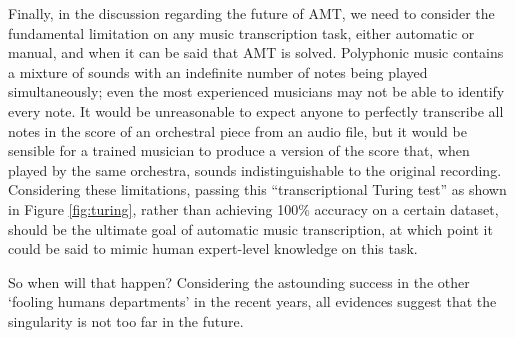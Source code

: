Finally, in the discussion regarding the future of AMT, we need to consider the fundamental limitation on any music transcription task, either automatic or manual, and when it can be said that AMT is solved.
Polyphonic music contains a mixture of sounds with an indefinite number of notes being played simultaneously; even the most experienced musicians may not be able to identify every note. %
It would be unreasonable to expect anyone to perfectly transcribe all notes in the score of an orchestral piece from an audio file, but it would be sensible for a trained musician to produce a version of the score that, when played by the same orchestra, sounds indistinguishable to the original recording.
Considering these limitations, passing this ``transcriptional Turing test'' as shown in Figure \ref{fig:turing}, rather than achieving 100\% accuracy on a certain dataset, should be the ultimate goal of automatic music transcription, at which point it could be said to mimic human expert-level knowledge on this task.

So when will that happen? Considering the astounding success in the other `fooling humans departments' in the recent years, all evidences suggest that the singularity is not too far in the future. 

\pagebreak